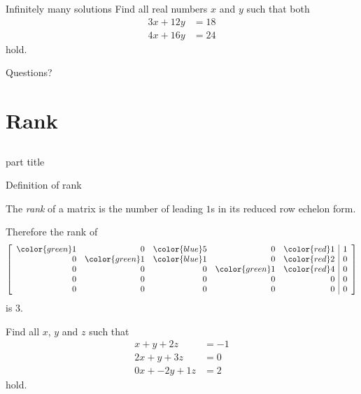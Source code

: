 \documentclass{beamer}
\begin{document}
\begin{frame}{Infinitely many solutions}
  Find all real numbers $x$ and $y$ such that both
  \begin{align*}
    3x+12y&=18\\
    4x+16y&=24
  \end{align*}
  hold.
\end{frame}

\begin{frame}
Questions?
\end{frame}

\section{Rank}
\subsection{}
\begin{frame}
    \begin{beamercolorbox}[sep=12pt,center]{part title}
      \insertsection\par
    \end{beamercolorbox}
\end{frame}

\begin{frame}{Definition of rank}
  \begin{definition}
    The \emph{rank} of a matrix is the number of leading $1$s in its reduced row echelon form.
  \end{definition}
  \begin{example}
    Therefore the rank of
    \begin{equation*}
      \left[\begin{array}{rrrrr|r}
              {\color{green}1} & 0 & {\color{blue}5} & 0 & {\color{red}1} &1 \\
              0 & {\color{green}1} & {\color{blue}1} & 0 & {\color{red}2} &0 \\
              0 & 0 & 0 & {\color{green}1} & {\color{red}4} &0 \\
              0 & 0 & 0 & 0 & 0 &0\\
              0 & 0 & 0 & 0 & 0 &0
            \end{array}\right] 
        \end{equation*}
        is $3$.
      \end{example}
\end{frame}

\begin{frame}
  Find all $x$, $y$ and $z$ such that
  \begin{align*}
    x+y+2z&=-1\\
    2x+y+3z&=0\\
    0x+-2y+1z&=2
  \end{align*}
  hold.
\end{frame}
\end{document}
